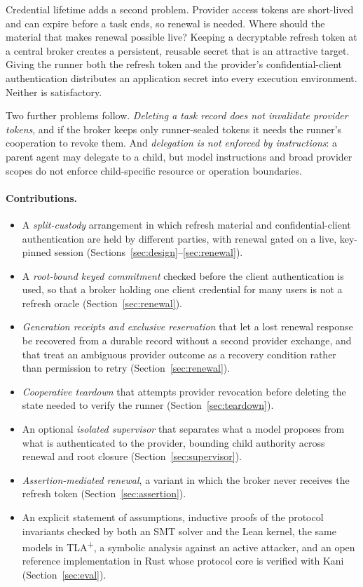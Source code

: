 \documentclass[11pt]{article}
\begin{document}
Credential lifetime adds a second problem. Provider access tokens are short-lived and can expire before a task ends, so renewal is needed. Where should the material that makes renewal possible live? Keeping a decryptable refresh token at a central broker creates a persistent, reusable secret that is an attractive target. Giving the runner both the refresh token and the provider's confidential-client authentication distributes an application secret into every execution environment. Neither is satisfactory.

Two further problems follow. \emph{Deleting a task record does not invalidate provider tokens}, and if the broker keeps only runner-sealed tokens it needs the runner's cooperation to revoke them. And \emph{delegation is not enforced by instructions}: a parent agent may delegate to a child, but model instructions and broad provider scopes do not enforce child-specific resource or operation boundaries.

\paragraph{Contributions.}
\begin{itemize}
\item A \emph{split-custody} arrangement in which refresh material and confidential-client authentication are held by different parties, with renewal gated on a live, key-pinned session (Sections~\ref{sec:design}--\ref{sec:renewal}).
\item A \emph{root-bound keyed commitment} checked before the client authentication is used, so that a broker holding one client credential for many users is not a refresh oracle (Section~\ref{sec:renewal}).
\item \emph{Generation receipts and exclusive reservation} that let a lost renewal response be recovered from a durable record without a second provider exchange, and that treat an ambiguous provider outcome as a recovery condition rather than permission to retry (Section~\ref{sec:renewal}).
\item \emph{Cooperative teardown} that attempts provider revocation before deleting the state needed to verify the runner (Section~\ref{sec:teardown}).
\item An optional \emph{isolated supervisor} that separates what a model proposes from what is authenticated to the provider, bounding child authority across renewal and root closure (Section~\ref{sec:supervisor}).
\item \emph{Assertion-mediated renewal}, a variant in which the broker never receives the refresh token (Section~\ref{sec:assertion}).
\item An explicit statement of assumptions, inductive proofs of the protocol invariants checked by both an SMT solver and the Lean kernel, the same models in TLA\textsuperscript{+}, a symbolic analysis against an active attacker, and an open reference implementation in Rust whose protocol core is verified with Kani (Section~\ref{sec:eval}).
\end{itemize}
\end{document}
